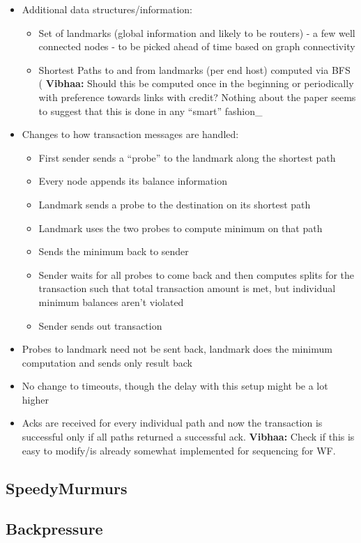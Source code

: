 \documentclass[a4paper]{article}
\newcommand{\vls}[1]{{\color{blue} \textbf{Vibhaa:} {#1}}}
\begin{document}
\begin{itemize}
    \item Additional data structures/information:
        \begin{itemize}
            \item Set of landmarks (global information and likely to be routers) - a few well connected nodes - 
                to be picked ahead of time based on graph connectivity
            \item Shortest Paths to and from landmarks (per end host)
                computed via BFS (\vls{Should this be computed once in
                    the beginning or periodically with preference towards links with credit? Nothing about
                the paper seems to suggest that this is done in any ``smart'' fashion}_
        \end{itemize}

    \item Changes to how transaction messages are handled:
        \begin{itemize}
            \item First sender sends a ``probe'' to the landmark along the shortest path
            \item Every node appends its balance information
            \item Landmark sends a probe to the destination on its shortest path
            \item Landmark uses the two probes to compute minimum on that path
            \item Sends the minimum back to sender
            \item Sender waits for all probes to come back and then computes splits for the transaction
                such that total transaction amount is met, but individual minimum balances aren't violated
            \item Sender sends out transaction
        \end{itemize}

    \item Probes to landmark need not be sent back, landmark does the minimum computation and sends 
        only result back
    
    \item No change to timeouts, though the delay with this setup might be a lot higher

    \item Acks are received for every individual path and now the transaction is successful only if all paths
        returned a successful ack. \vls{Check if this is easy to modify/is already somewhat implemented for 
        sequencing for WF}.
\end{itemize}


\subsection{SpeedyMurmurs}

\subsection{Backpressure}
\end{document}
